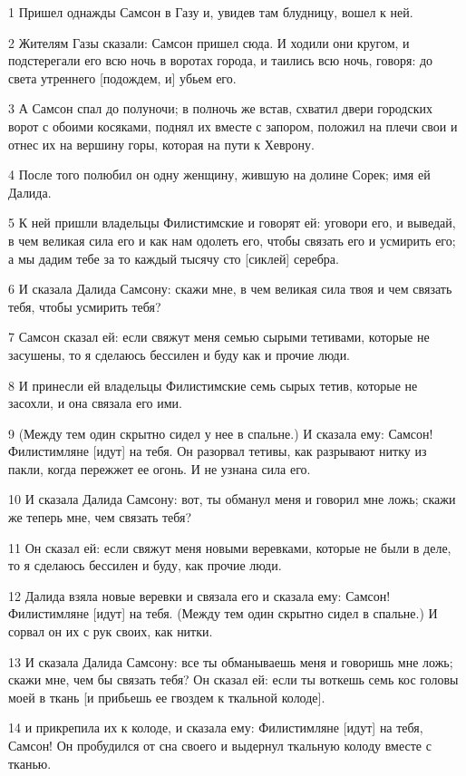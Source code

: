 \par 1 Пришел однажды Самсон в Газу и, увидев там блудницу, вошел к ней.
\par 2 Жителям Газы сказали: Самсон пришел сюда. И ходили они кругом, и подстерегали его всю ночь в воротах города, и таились всю ночь, говоря: до света утреннего [подождем, и] убьем его.
\par 3 А Самсон спал до полуночи; в полночь же встав, схватил двери городских ворот с обоими косяками, поднял их вместе с запором, положил на плечи свои и отнес их на вершину горы, которая на пути к Хеврону.
\par 4 После того полюбил он одну женщину, жившую на долине Сорек; имя ей Далида.
\par 5 К ней пришли владельцы Филистимские и говорят ей: уговори его, и выведай, в чем великая сила его и как нам одолеть его, чтобы связать его и усмирить его; а мы дадим тебе за то каждый тысячу сто [сиклей] серебра.
\par 6 И сказала Далида Самсону: скажи мне, в чем великая сила твоя и чем связать тебя, чтобы усмирить тебя?
\par 7 Самсон сказал ей: если свяжут меня семью сырыми тетивами, которые не засушены, то я сделаюсь бессилен и буду как и прочие люди.
\par 8 И принесли ей владельцы Филистимские семь сырых тетив, которые не засохли, и она связала его ими.
\par 9 (Между тем один скрытно сидел у нее в спальне.) И сказала ему: Самсон! Филистимляне [идут] на тебя. Он разорвал тетивы, как разрывают нитку из пакли, когда пережжет ее огонь. И не узнана сила его.
\par 10 И сказала Далида Самсону: вот, ты обманул меня и говорил мне ложь; скажи же теперь мне, чем связать тебя?
\par 11 Он сказал ей: если свяжут меня новыми веревками, которые не были в деле, то я сделаюсь бессилен и буду, как прочие люди.
\par 12 Далида взяла новые веревки и связала его и сказала ему: Самсон! Филистимляне [идут] на тебя. (Между тем один скрытно сидел в спальне.) И сорвал он их с рук своих, как нитки.
\par 13 И сказала Далида Самсону: все ты обманываешь меня и говоришь мне ложь; скажи мне, чем бы связать тебя? Он сказал ей: если ты воткешь семь кос головы моей в ткань [и прибьешь ее гвоздем к ткальной колоде].
\par 14 и прикрепила их к колоде, и сказала ему: Филистимляне [идут] на тебя, Самсон! Он пробудился от сна своего и выдернул ткальную колоду вместе с тканью.
